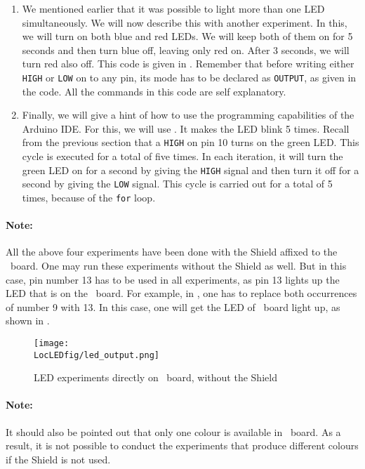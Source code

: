 \begin{enumerate}
  \item We mentioned earlier that it was possible to light more than one
        LED simultaneously.  We will now describe this with another
        experiment.  In this, we will turn on both blue and red LEDs.  We
        will keep both of them on for 5 seconds and then turn blue off,
        leaving only red on.  After 3 seconds, we will turn red also off.
        This code is given in .  Remember that
        before writing either {\tt HIGH} or {\tt LOW} on to any pin, its
        mode has to be declared as {\tt OUTPUT}, as given in the code.  All
        the commands in this code are self explanatory.
        
  \item Finally, we will give a hint of how to use the programming
        capabilities of the Arduino IDE.  For this, we will use
        .  It makes the LED blink 5 times.  Recall
        from the previous section that a {\tt HIGH} on pin 10 turns on the
        green LED.  This cycle is executed for a total of five times.  In each
        iteration, it will turn the green LED on for a second by giving the
          {\tt HIGH} signal and then turn it off for a second by giving the
          {\tt LOW} signal.  This cycle is carried out for a total of 5 times,
        because of the {\tt for} loop.
\end{enumerate}

\paragraph{Note:}
All the above four experiments have been done with
the Shield affixed to the \arduino\ board.  One may run these
experiments without the Shield as well.  But in this case, pin number
13 has to be used in all experiments, as pin 13 lights up the LED that
is on the \arduino\ board.  For example, in , one
has to replace both occurrences of number 9 with 13.  In this case,
one will get the LED of \arduino\ board light up, as shown in
.
\begin{figure}
  \centering
  \texttt{[image: \\LocLEDfig/led\_output.png]}
  \caption{LED experiments directly on \arduino\ board, without the
    Shield}
  \label{fig:led-uno}
\end{figure}


\paragraph{Note:} It should also be pointed out that only one colour
is available in \arduino\ board.  As a result, it is not possible to
conduct the experiments that produce different colours if the
Shield is not used.

